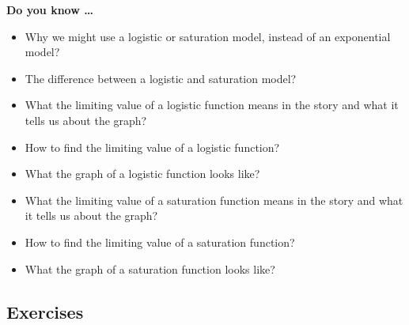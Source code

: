 
 

\noindent \textbf{Do you know \ldots}  

\begin{itemize}
\item Why we might use a logistic or saturation model, instead of an exponential model?
\item The difference between a logistic and saturation model?

\item What the limiting value of a logistic function means in the story and what it tells us about the graph? 
\item How to find the limiting value of a logistic function?  
\item What the graph of a logistic function looks like? 

\item What the limiting value of a saturation function means in the story and what it tells us about the graph? 
\item How to find the limiting value of a saturation function?  
\item What the graph of a saturation function looks like? 

  
\end{itemize}

\subsection*{Exercises}


